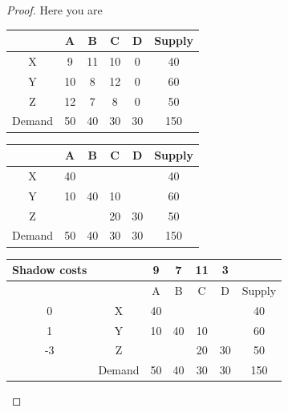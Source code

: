 \documentclass[a4paper]{article}
\begin{document}
\begin{eg}
	\begin{proof}
		Here you are
		\begin{center}
			\begin{tabular}{|c|c|c|c|c|c|}
				\hline
				       & A  & B  & C  & D  & Supply \\
				\hline
				X      & 9  & 11 & 10 & 0  & 40     \\
				\hline
				Y      & 10 & 8  & 12 & 0  & 60     \\
				\hline
				Z      & 12 & 7  & 8  & 0  & 50     \\
				\hline
				Demand & 50 & 40 & 30 & 30 & 150    \\
				\hline
			\end{tabular}
		\end{center}
		\begin{center}
			\begin{tabular}{|c|c|c|c|c|c|}
				\hline
				       & A  & B  & C  & D  & Supply \\
				\hline
				X      & 40 &    &    &    & 40     \\
				\hline
				Y      & 10 & 40 & 10 &    & 60     \\
				\hline
				Z      &    &    & 20 & 30 & 50     \\
				\hline
				Demand & 50 & 40 & 30 & 30 & 150    \\
				\hline
			\end{tabular}
		\end{center}
		\begin{center}
			\begin{tabular}{|c|c|c|c|c|c|c|}
				\hline
				Shadow costs &        & 9  & 7  & 11 & 3  &        \\
				\hline
				             &        & A  & B  & C  & D  & Supply \\
				\hline
				0            & X      & 40 &    &    &    & 40     \\
				\hline
				1            & Y      & 10 & 40 & 10 &    & 60     \\
				\hline
				-3           & Z      &    &    & 20 & 30 & 50     \\
				\hline
				             & Demand & 50 & 40 & 30 & 30 & 150    \\
				\hline
			\end{tabular}
		\end{center}
	\end{proof}
\end{eg}
\end{document}
